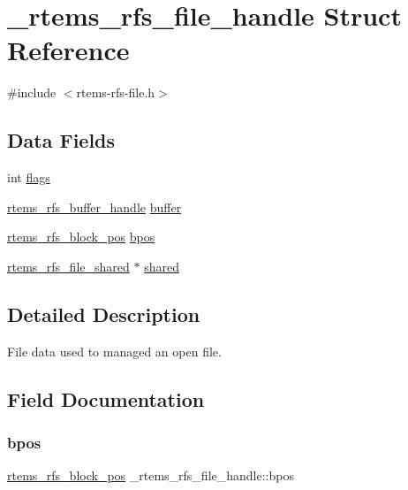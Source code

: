 \hypertarget{struct__rtems__rfs__file__handle}{}\section{\+\_\+rtems\+\_\+rfs\+\_\+file\+\_\+handle Struct Reference}
\label{struct__rtems__rfs__file__handle}


{\ttfamily \#include $<$rtems-\/rfs-\/file.\+h$>$}

\subsection*{Data Fields}
\begin{DoxyCompactItemize}
\item 
int \mbox{\hyperlink{struct__rtems__rfs__file__handle_a445c19e3d76da08510851cf726ac1af5}{flags}}
\item 
\mbox{\hyperlink{rtems-rfs-buffer_8h_a17f97c37c5273ad28d413dfd2d175e23}{rtems\+\_\+rfs\+\_\+buffer\+\_\+handle}} \mbox{\hyperlink{struct__rtems__rfs__file__handle_aaef16592d0b0c80d20b25affc231cc0f}{buffer}}
\item 
\mbox{\hyperlink{rtems-rfs-block-pos_8h_a0d8bd7482333e584a03df45e60cda226}{rtems\+\_\+rfs\+\_\+block\+\_\+pos}} \mbox{\hyperlink{struct__rtems__rfs__file__handle_a73b9e17052dcec657fe92a70f20c7ac9}{bpos}}
\item 
\mbox{\hyperlink{rtems-rfs-file_8h_adb93e0b8dc15817a098cb105949cc3c7}{rtems\+\_\+rfs\+\_\+file\+\_\+shared}} $\ast$ \mbox{\hyperlink{struct__rtems__rfs__file__handle_a7bd82aa3d31f2d8127df58472a18655f}{shared}}
\end{DoxyCompactItemize}


\subsection{Detailed Description}
File data used to managed an open file. 

\subsection{Field Documentation}
\mbox{\label{struct__rtems__rfs__file__handle_a73b9e17052dcec657fe92a70f20c7ac9}} 
\subsubsection{\texorpdfstring{bpos}{bpos}}
{\footnotesize\ttfamily \mbox{\hyperlink{rtems-rfs-block-pos_8h_a0d8bd7482333e584a03df45e60cda226}{rtems\+\_\+rfs\+\_\+block\+\_\+pos}} \+\_\+rtems\+\_\+rfs\+\_\+file\+\_\+handle\+::bpos}

